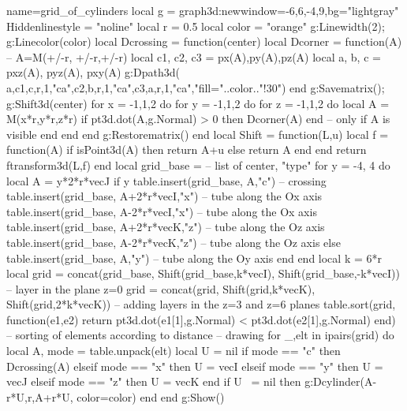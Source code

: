 \documentclass[border=5pt]{standalone}%
\begin{document}
\begin{luadraw}{name=grid_of_cylinders}
local g = graph3d:new{window={-6,6,-4,9},bg="lightgray" }
Hiddenlinestyle = "noline"
local r = 0.5
local color = "orange"
g:Linewidth(2); g:Linecolor(color)
local Dcrossing = function(center)
    local Dcorner = function(A) -- A=M(+/-r, +/-r,+/-r)
        local c1, c2, c3 = px(A),py(A),pz(A)
        local a, b, c = pxz(A), pyz(A), pxy(A)
        g:Dpath3d( {a,c1,c,r,1,"ca",c2,b,r,1,"ca",c3,a,r,1,"ca"},"fill="..color.."!30")
    end
    g:Savematrix(); g:Shift3d(center)
    for x = -1,1,2 do
        for y = -1,1,2 do
            for z = -1,1,2 do
                local A = M(x*r,y*r,z*r)
                if pt3d.dot(A,g.Normal) > 0 then Dcorner(A) end -- only if A is visible
            end
        end
    end
    g:Restorematrix()
end
local Shift = function(L,u)
    local f = function(A)
        if isPoint3d(A) then return A+u else return A end
    end
    return ftransform3d(L,f)
end
local grid_base = {} -- list of {center, "type"}
for y = -4, 4  do
    local A = y*2*r*vecJ
    if y%
        table.insert(grid_base, {A,"c"}) -- crossing
        table.insert(grid_base, {A+2*r*vecI,"x"}) -- tube along the Ox axis
        table.insert(grid_base, {A-2*r*vecI,"x"}) -- tube along the Ox axis
        table.insert(grid_base, {A+2*r*vecK,"z"}) -- tube along the Oz axis
        table.insert(grid_base, {A-2*r*vecK,"z"}) -- tube along the Oz axis
    else
        table.insert(grid_base, {A,"y"}) -- tube along the Oy axis
    end
end
local k = 6*r
local grid = concat(grid_base, Shift(grid_base,k*vecI), Shift(grid_base,-k*vecI)) -- layer in the plane z=0
grid = concat(grid, Shift(grid,k*vecK), Shift(grid,2*k*vecK))  -- adding layers in the z=3 and z=6 planes
table.sort(grid, function(e1,e2) return pt3d.dot(e1[1],g.Normal) < pt3d.dot(e2[1],g.Normal) end) -- sorting of elements according to distance
-- drawing
for _,elt in ipairs(grid) do
    local A, mode = table.unpack(elt)
    local U = nil
    if mode == "c" then Dcrossing(A)
    elseif mode == "x" then U = vecI
    elseif mode == "y" then U = vecJ
    elseif mode == "z" then U = vecK
    end
    if U ~= nil then g:Dcylinder(A-r*U,r,A+r*U, {color=color}) end
end 
g:Show()
\end{luadraw}
\end{document}
